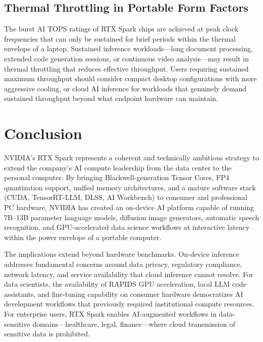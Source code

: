 \documentclass[conference]{IEEEtran}
\begin{document}
\subsection{Thermal Throttling in Portable Form Factors}

The burst AI TOPS ratings of RTX Spark chips are achieved at peak clock frequencies that can only be sustained for brief periods within the thermal envelope of a laptop. Sustained inference workloads---long document processing, extended code generation sessions, or continuous video analysis---may result in thermal throttling that reduces effective throughput. Users requiring sustained maximum throughput should consider compact desktop configurations with more aggressive cooling, or cloud AI inference for workloads that genuinely demand sustained throughput beyond what endpoint hardware can maintain.

\section{Conclusion}
\label{sec:conclusion}

NVIDIA's RTX Spark represents a coherent and technically ambitious strategy to extend the company's AI compute leadership from the data center to the personal computer. By bringing Blackwell-generation Tensor Cores, FP4 quantization support, unified memory architectures, and a mature software stack (CUDA, TensorRT-LLM, DLSS, AI Workbench) to consumer and professional PC hardware, NVIDIA has created an on-device AI platform capable of running 7B--13B parameter language models, diffusion image generators, automatic speech recognition, and GPU-accelerated data science workflows at interactive latency within the power envelope of a portable computer.

The implications extend beyond hardware benchmarks. On-device inference addresses fundamental concerns around data privacy, regulatory compliance, network latency, and service availability that cloud inference cannot resolve. For data scientists, the availability of RAPIDS GPU acceleration, local LLM code assistants, and fine-tuning capability on consumer hardware democratizes AI development workflows that previously required institutional compute resources. For enterprise users, RTX Spark enables AI-augmented workflows in data-sensitive domains---healthcare, legal, finance---where cloud transmission of sensitive data is prohibited.
\end{document}

